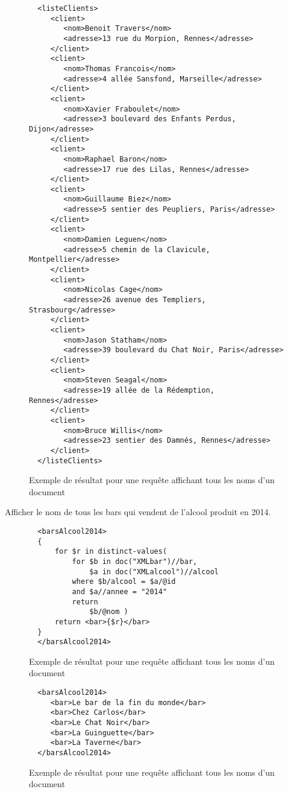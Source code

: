 \documentclass[a4paper,10pt]{article}
\begin{document}
\begin{figure}[ht!]
\begin{verbatim}
  <listeClients>
     <client>
        <nom>Benoit Travers</nom>
        <adresse>13 rue du Morpion, Rennes</adresse>
     </client>
     <client>
        <nom>Thomas Francois</nom>
        <adresse>4 allée Sansfond, Marseille</adresse>
     </client>
     <client>
        <nom>Xavier Fraboulet</nom>
        <adresse>3 boulevard des Enfants Perdus, Dijon</adresse>
     </client>
     <client>
        <nom>Raphael Baron</nom>
        <adresse>17 rue des Lilas, Rennes</adresse>
     </client>
     <client>
        <nom>Guillaume Biez</nom>
        <adresse>5 sentier des Peupliers, Paris</adresse>
     </client>
     <client>
        <nom>Damien Leguen</nom>
        <adresse>5 chemin de la Clavicule, Montpellier</adresse>
     </client>
     <client>
        <nom>Nicolas Cage</nom>
        <adresse>26 avenue des Templiers, Strasbourg</adresse>
     </client>
     <client>
        <nom>Jason Statham</nom>
        <adresse>39 boulevard du Chat Noir, Paris</adresse>
     </client>
     <client>
        <nom>Steven Seagal</nom>
        <adresse>19 allée de la Rédemption, Rennes</adresse>
     </client>
     <client>
        <nom>Bruce Willis</nom>
        <adresse>23 sentier des Damnés, Rennes</adresse>
     </client>
  </listeClients>
\end{verbatim}
\caption{Exemple de résultat pour une requête affichant tous les noms d'un document}
\label{lst:resultatTest2}
\end{figure}


Afficher le nom de tous les bars qui vendent de l'alcool produit en 2014.

\begin{figure}[ht!]
\begin{verbatim}
  <barsAlcool2014>
  {
      for $r in distinct-values(
          for $b in doc("XMLbar")//bar,
              $a in doc("XMLalcool")//alcool
          where $b/alcool = $a/@id
          and $a//annee = "2014"
          return 
              $b/@nom )
      return <bar>{$r}</bar>
  }
  </barsAlcool2014>
\end{verbatim}
\caption{Exemple de résultat pour une requête affichant tous les noms d'un document}
\label{lst:requeteTest3}
\end{figure}

\begin{figure}[ht!]
\begin{verbatim}
  <barsAlcool2014>
     <bar>Le bar de la fin du monde</bar>
     <bar>Chez Carlos</bar>
     <bar>Le Chat Noir</bar>
     <bar>La Guinguette</bar>
     <bar>La Taverne</bar>
  </barsAlcool2014>
\end{verbatim}
\caption{Exemple de résultat pour une requête affichant tous les noms d'un document}
\label{lst:resultatTest3}
\end{figure}
\end{document}
